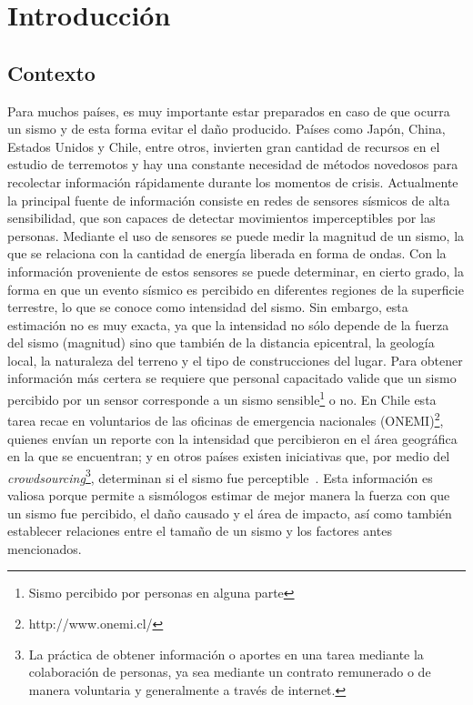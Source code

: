 %

\chapter{Introducción}

\section{Contexto}
Para muchos países, es muy importante estar preparados en caso de que ocurra un sismo y de esta forma evitar el daño producido.
%
Países como Japón, China, Estados Unidos y Chile, entre otros, invierten gran cantidad de recursos en el estudio de terremotos y hay una constante necesidad de métodos novedosos para recolectar información rápidamente durante los momentos de crisis.
%
Actualmente la principal fuente de información consiste en redes de sensores sísmicos de alta sensibilidad, que son capaces de detectar movimientos imperceptibles por las personas. 
%
Mediante el uso de sensores se puede medir la magnitud de un sismo, la que se relaciona con la cantidad de energía liberada en forma de ondas. 
%
Con la información proveniente de estos sensores se puede determinar, en cierto grado, la forma en que un evento sísmico es percibido en diferentes regiones de la superficie terrestre, lo que se conoce como intensidad del sismo. 
%
Sin embargo, esta estimación no es muy exacta, ya que la intensidad no sólo depende de la fuerza del sismo (magnitud) sino que también de la distancia epicentral, la geología local, la naturaleza del terreno y el tipo de construcciones del lugar.
%
Para obtener información más certera se requiere que personal capacitado valide que un sismo percibido por un sensor corresponde a un sismo sensible\footnote{Sismo percibido por personas en alguna parte} o no. 
%
En Chile esta tarea recae en voluntarios de las oficinas de emergencia nacionales (ONEMI)\footnote{http://www.onemi.cl/}, quienes envían un reporte con la intensidad que percibieron en el área geográfica en la que se encuentran; 
%
y en otros países existen iniciativas que, por medio del \textit{crowdsourcing}\footnote{La práctica de obtener información o aportes en una tarea mediante la colaboración de personas, ya sea mediante un contrato remunerado o de manera voluntaria y generalmente a través de internet.}, determinan si el sismo fue perceptible~\cite{atkinson2007did}.
%
Esta información es valiosa porque permite a sismólogos estimar de mejor manera la fuerza con que un sismo fue percibido, el daño causado y el área de impacto, así como también establecer relaciones entre el tamaño de un sismo y los factores antes mencionados. 



